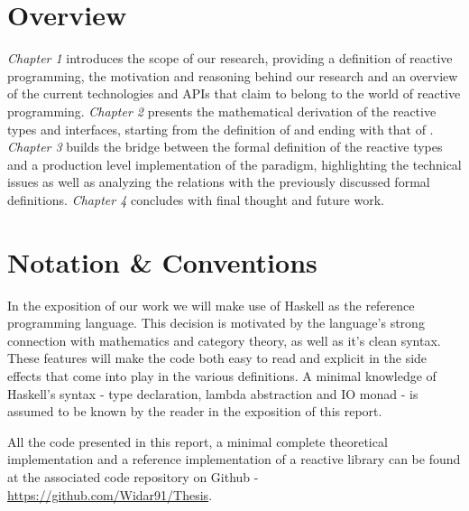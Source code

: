 \section*{Overview}

\textit{Chapter 1} introduces the scope of our research, providing a definition of reactive programming, the motivation and reasoning behind our research and an overview of the current technologies and APIs that claim to belong to the world of reactive programming. \textit{Chapter 2} presents the mathematical derivation of the reactive types and interfaces, starting from the definition of  and ending with that of . \textit{Chapter 3} builds the bridge between the formal definition of the reactive types and a production level implementation of the paradigm, highlighting the technical issues as well as analyzing the relations with the previously discussed formal definitions. \textit{Chapter 4} concludes with final thought and future work.

\section*{Notation \& Conventions}

In the exposition of our work we will make use of Haskell as the reference programming language. This decision is motivated by the language's strong connection with mathematics and category theory, as well as it's clean syntax. These features will make the code both easy to read and explicit in the side effects that come into play in the various definitions. A minimal knowledge of Haskell's syntax - type declaration, lambda abstraction and IO monad - is assumed to be known by the reader in the exposition of this report. 

All the code presented in this report, a minimal complete theoretical implementation and a reference implementation of a reactive library can be found at the associated code repository on Github - \url{https://github.com/Widar91/Thesis}. 